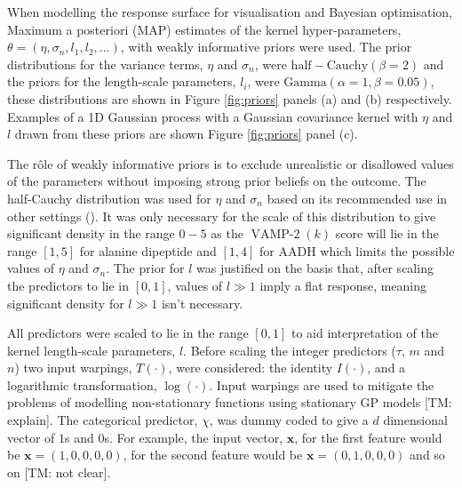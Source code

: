 When modelling the response surface for visualisation and Bayesian optimisation, Maximum a posteriori (MAP) estimates  of the kernel hyper-parameters, $\theta = (\eta, \sigma_{n}, l_{1}, l_{2}, ...)$, with weakly informative priors were used. The prior distributions for the variance terms, $\eta$ and $\sigma_{n}$, were $\mathrm{half-Cauchy}(\beta=2)$ and the priors for the length-scale parameters, $l_{i}$, were $\mathrm{Gamma}(\alpha=1, \beta=0.05)$, these distributions are shown in Figure \ref{fig:priors} panels (a) and (b) respectively.  Examples of a 1D Gaussian process with a Gaussian covariance kernel with $\eta$ and $l$ drawn from these priors are shown Figure \ref{fig:priors} panel (c).  

The r\^ole of weakly informative priors is to exclude unrealistic or disallowed values of the parameters without imposing strong prior beliefs on the outcome. The half-Cauchy distribution  was used for $\eta$ and $\sigma_n$  based on its recommended use in other settings (\cite{polsonHalfCauchyPriorGlobal2012}). It was  only necessary for the scale of this distribution to give significant density in the range $0-5$ as the $\operatorname{VAMP-2}(k)$ score will lie in the range $[1,5]$ for alanine dipeptide and $[1, 4]$ for AADH which limits the possible values of $\eta$ and $\sigma_{n}$. The prior for $l$ was justified on the basis that, after scaling the predictors to lie in $[0, 1]$, values of $l \gg 1$ imply a flat response, meaning significant density for $l \gg 1$ isn't necessary. 

All predictors were scaled to lie in the range $[0, 1]$ to aid interpretation of the kernel length-scale parameters, $l$. Before scaling the integer predictors ($\tau$, $m$ and $n$) two input warpings, $T(\cdot)$, were considered: the identity $I(\cdot)$, and a logarithmic transformation, $\log(\cdot)$.  Input warpings are used \cite{snoekInputWarpingBayesian2014a} to mitigate the problems of modelling non-stationary functions using stationary GP models [TM: explain]. The categorical predictor, $\chi$, was dummy coded \cite{dalyDummyCodingVs2016} to give a $d$ dimensional vector of $1$s and $0$s. For example, the input vector, $\mathbf{x}$, for the first feature would be $\mathbf{x} = (1, 0, 0, 0, 0)$, for the second feature would be $\mathbf{x} = (0, 1, 0, 0, 0)$ and so on [TM: not clear]. 

